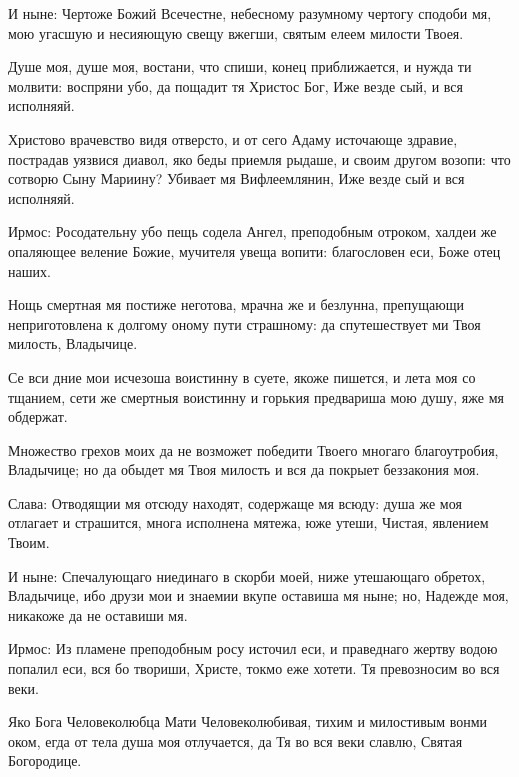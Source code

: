 И ныне: Чертоже Божий Всечестне, небесному разумному чертогу сподоби мя, мою угасшую и несияющую свещу вжегши, святым елеем милости Твоея.




Душе моя, душе моя, востани, что спиши, конец приближается, и нужда ти молвити: воспряни убо, да пощадит тя Христос Бог, Иже везде сый, и вся исполняяй.




Христово врачевство видя отверсто, и от сего Адаму источающе здравие, пострадав уязвися диавол, яко беды приемля рыдаше, и своим другом возопи: что сотворю Сыну Мариину? Убивает мя Вифлеемлянин, Иже везде сый и вся исполняяй.




Ирмос: Росодательну убо пещь содела Ангел, преподобным отроком, халдеи же опаляющее веление Божие, мучителя увеща вопити: благословен еси, Боже отец наших.


\medskip


Нощь смертная мя постиже неготова, мрачна же и безлунна, препущающи неприготовлена к долгому оному пути страшному: да спутешествует ми Твоя милость, Владычице.


Се вси дние мои исчезоша воистинну в суете, якоже пишется, и лета моя со тщанием, сети же смертныя воистинну и горькия предвариша мою душу, яже мя обдержат.


Множество грехов моих да не возможет победити Твоего многаго благоутробия, Владычице; но да обыдет мя Твоя милость и вся да покрыет беззакония моя.


Слава: Отводящии мя отсюду находят, содержаще мя всюду: душа же моя отлагает и страшится, многа исполнена мятежа, юже утеши, Чистая, явлением Твоим.


И ныне: Спечалующаго ниединаго в скорби моей, ниже утешающаго обретох, Владычице, ибо друзи мои и знаемии вкупе оставиша мя ныне; но, Надежде моя, никакоже да не оставиши мя.




Ирмос: Из пламене преподобным росу источил еси, и праведнаго жертву водою попалил еси, вся бо твориши, Христе, токмо еже хотети. Тя превозносим во вся веки.


\medskip


Яко Бога Человеколюбца Мати Человеколюбивая, тихим и милостивым вонми оком, егда от тела душа моя отлучается, да Тя во вся веки славлю, Святая Богородице.


